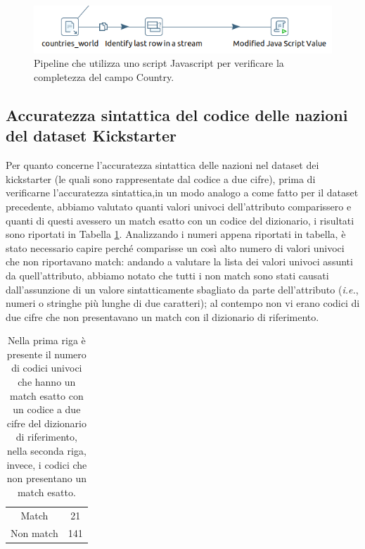 \begin{figure}
	\centering
	\includegraphics[width=0.7\linewidth]{images/DQ_completezzacountry}
	\caption{Pipeline che utilizza uno script Javascript per verificare la completezza del campo Country.}
	\label{fig:dqcompletezzacountry}
\end{figure}


\subsection{Accuratezza sintattica del codice delle nazioni del dataset Kickstarter}
Per quanto concerne l'accuratezza sintattica delle nazioni nel dataset dei kickstarter (le quali sono rappresentate dal codice a due cifre), prima di verificarne l'accuratezza sintattica,in un modo analogo a come fatto per il dataset precedente, abbiamo valutato quanti valori univoci dell'attributo comparissero e quanti di questi avessero un match esatto con un codice del dizionario, i risultati sono riportati in Tabella \ref{tab:unique_code_country}.
Analizzando i numeri appena riportati in tabella, è stato necessario capire perché comparisse un così alto numero di valori univoci che non riportavano match: andando a valutare la lista dei valori univoci assunti da quell'attributo, abbiamo notato che tutti i non match sono stati causati dall'assunzione di un valore sintatticamente sbagliato da parte dell'attributo (\textit{i.e.}, numeri o stringhe più lunghe di due caratteri); al contempo non vi erano codici di due cifre che non presentavano un match con il dizionario di riferimento.

\begin{table}
	\caption{Nella prima riga è presente il numero di codici univoci che hanno un match esatto con un codice a due cifre del dizionario di riferimento, nella seconda riga, invece, i codici che non presentano un match esatto.}
	
	\label{tab:unique_code_country}
	
	\centering
	\begin{tabular}{c|c}
		Match & 21\\ 
		Non match & 141 \\
	\end{tabular}
\end{table} 

